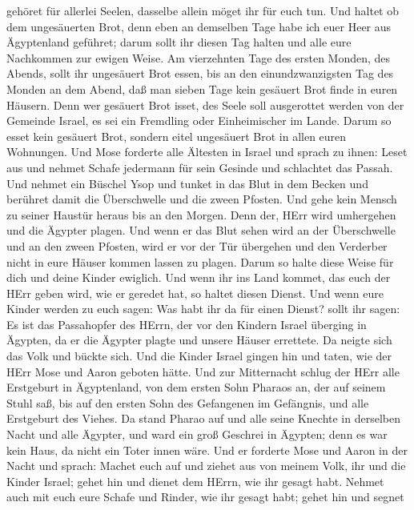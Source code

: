 gehöret für allerlei Seelen, dasselbe allein möget ihr für euch tun.
 Und haltet ob dem ungesäuerten Brot, denn eben an
demselben Tage habe ich euer Heer aus Ägyptenland geführet; darum sollt
ihr diesen Tag halten und alle eure Nachkommen zur ewigen Weise.
 Am vierzehnten Tage des ersten Monden, des Abends, sollt
ihr ungesäuert Brot essen, bis an den einundzwanzigsten Tag des Monden
an dem Abend,  daß man sieben Tage kein gesäuert Brot finde
in euren Häusern. Denn wer gesäuert Brot isset, des Seele soll
ausgerottet werden von der Gemeinde Israel, es sei ein Fremdling oder
Einheimischer im Lande.  Darum so esset kein gesäuert Brot,
sondern eitel ungesäuert Brot in allen euren Wohnungen. 
Und Mose forderte alle Ältesten in Israel und sprach zu ihnen: Leset aus
und nehmet Schafe jedermann für sein Gesinde und schlachtet das Passah.
 Und nehmet ein Büschel Ysop und tunket in das Blut in dem
Becken und berühret damit die Überschwelle und die zween Pfosten. Und
gehe kein Mensch zu seiner Haustür heraus bis an den Morgen.
 Denn der, HErr wird umhergehen und die Ägypter plagen. Und
wenn er das Blut sehen wird an der Überschwelle und an den zween
Pfosten, wird er vor der Tür übergehen und den Verderber nicht in eure
Häuser kommen lassen zu plagen.  Darum so halte diese Weise
für dich und deine Kinder ewiglich.  Und wenn ihr ins Land
kommet, das euch der HErr geben wird, wie er geredet hat, so haltet
diesen Dienst.  Und wenn eure Kinder werden zu euch sagen:
Was habt ihr da für einen Dienst?  sollt ihr sagen: Es ist
das Passahopfer des HErrn, der vor den Kindern Israel überging in
Ägypten, da er die Ägypter plagte und unsere Häuser errettete. Da neigte
sich das Volk und bückte sich.  Und die Kinder Israel
gingen hin und taten, wie der HErr Mose und Aaron geboten hätte.
 Und zur Mitternacht schlug der HErr alle Erstgeburt in
Ägyptenland, von dem ersten Sohn Pharaos an, der auf seinem Stuhl saß,
bis auf den ersten Sohn des Gefangenen im Gefängnis, und alle Erstgeburt
des Viehes.  Da stand Pharao auf und alle seine Knechte in
derselben Nacht und alle Ägypter, und ward ein groß Geschrei in Ägypten;
denn es war kein Haus, da nicht ein Toter innen wäre.  Und
er forderte Mose und Aaron in der Nacht und sprach: Machet euch auf und
ziehet aus von meinem Volk, ihr und die Kinder Israel; gehet hin und
dienet dem HErrn, wie ihr gesagt habt.  Nehmet auch mit
euch eure Schafe und Rinder, wie ihr gesagt habt; gehet hin und segnet
